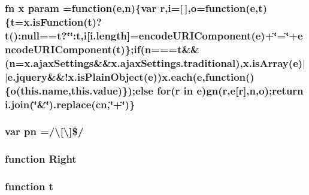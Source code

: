 \hypertarget{jquery-1_810_82_8min_8js_ae8915303d11557d1b001bc56b6195251}{
\subsubsection[{param}]{ {\bf fn} {\bf x} param =function({\bf e},n)\{var r,i=\mbox{[}$\,$\mbox{]},o=function({\bf e},{\bf t})\{{\bf t}={\bf x.\-is\-Function}({\bf t})?{\bf t}()\-:null=={\bf t}?\char`\"{}\char`\"{}\-:{\bf t},i\mbox{[}{\bf i.\-length}\mbox{]}=encode\-U\-R\-I\-Component({\bf e})+\char`\"{}=\char`\"{}+encode\-U\-R\-I\-Component({\bf t})\};{\bf if}(n==={\bf t}\&\&(n={\bf x.\-ajax\-Settings}\&\&x.\-ajax\-Settings.\-traditional),x.\-is\-Array({\bf e})$\vert$$\vert$e.\-jquery\&\&!{\bf x.\-is\-Plain\-Object}({\bf e})){\bf x.\-each}({\bf e},function()\{o(this.\-name,this.\-value)\});{\bf else} for(r in {\bf e}){\bf gn}(r,{\bf e}\mbox{[}r\mbox{]},n,o);return i.\-join(\char`\"{}\&\char`\"{}).replace({\bf cn},\char`\"{}+\char`\"{})\}}}\label{jquery-1_810_82_8min_8js_ae8915303d11557d1b001bc56b6195251}
\hypertarget{jquery-1_810_82_8min_8js_a6a40831f7c967a457dbbd3b5e6f287d7}{
\subsubsection[{pn}]{\setlength{\rightskip}{0pt plus 5cm}var pn =/\textbackslash{}\mbox{[}\textbackslash{}\mbox{]}\$/}}\label{jquery-1_810_82_8min_8js_a6a40831f7c967a457dbbd3b5e6f287d7}
\hypertarget{jquery-1_810_82_8min_8js_ac7f66efc33d974809d85fc5bdb00c6eb}{
\subsubsection[{Right}]{\setlength{\rightskip}{0pt plus 5cm}function Right}}\label{jquery-1_810_82_8min_8js_ac7f66efc33d974809d85fc5bdb00c6eb}
\hypertarget{jquery-1_810_82_8min_8js_a23c5666e83bbbceee94adcd0851f50c4}{
\subsubsection[{t}]{\setlength{\rightskip}{0pt plus 5cm}function t}}\label{jquery-1_810_82_8min_8js_a23c5666e83bbbceee94adcd0851f50c4}
